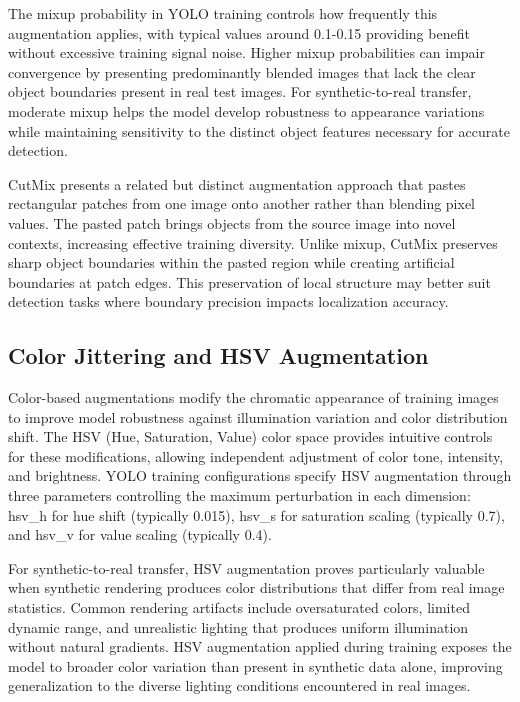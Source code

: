 The mixup probability in YOLO training controls how frequently this augmentation applies, with typical values around 0.1-0.15 providing benefit without excessive training signal noise. Higher mixup probabilities can impair convergence by presenting predominantly blended images that lack the clear object boundaries present in real test images. For synthetic-to-real transfer, moderate mixup helps the model develop robustness to appearance variations while maintaining sensitivity to the distinct object features necessary for accurate detection.

CutMix presents a related but distinct augmentation approach that pastes rectangular patches from one image onto another rather than blending pixel values. The pasted patch brings objects from the source image into novel contexts, increasing effective training diversity. Unlike mixup, CutMix preserves sharp object boundaries within the pasted region while creating artificial boundaries at patch edges. This preservation of local structure may better suit detection tasks where boundary precision impacts localization accuracy.

\subsection{Color Jittering and HSV Augmentation}

Color-based augmentations modify the chromatic appearance of training images to improve model robustness against illumination variation and color distribution shift. The HSV (Hue, Saturation, Value) color space provides intuitive controls for these modifications, allowing independent adjustment of color tone, intensity, and brightness. YOLO training configurations specify HSV augmentation through three parameters controlling the maximum perturbation in each dimension: hsv\_h for hue shift (typically 0.015), hsv\_s for saturation scaling (typically 0.7), and hsv\_v for value scaling (typically 0.4).

For synthetic-to-real transfer, HSV augmentation proves particularly valuable when synthetic rendering produces color distributions that differ from real image statistics. Common rendering artifacts include oversaturated colors, limited dynamic range, and unrealistic lighting that produces uniform illumination without natural gradients. HSV augmentation applied during training exposes the model to broader color variation than present in synthetic data alone, improving generalization to the diverse lighting conditions encountered in real images.


